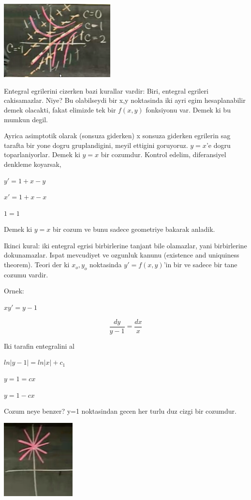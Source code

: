 \documentclass[12pt,fleqn]{article}
\begin{document}
\includegraphics[height=4cm]{./1_4.png}

Entegral egrilerini cizerken bazi kurallar vardir: Biri, entegral egrileri
cakisamazlar. Niye? Bu olabilseydi bir x,y noktasinda iki ayri egim
hesaplanabilir demek olacakti, fakat elimizde tek bir $f(x,y)$ fonksiyonu
var. Demek ki bu mumkun degil.

Ayrica asimptotik olarak (sonsuza giderken) x sonsuza giderken egrilerin sag
tarafta bir yone dogru gruplandigini, meyil ettigini goruyoruz. $y=x$'e dogru
toparlaniyorlar. Demek ki $y=x$ bir cozumdur. Kontrol edelim, diferansiyel
denkleme koyarsak,

$y' = 1+x-y$

$x' = 1+x-x$

$1 = 1$

Demek ki $y=x$ bir cozum ve bunu sadece geometriye bakarak anladik. 

Ikinci kural: iki entegral egrisi birbirlerine tanjant bile olamazlar, yani
birbirlerine dokunamazlar. Ispat mevcudiyet ve ozgunluk kanunu (existence and
uniquiness theorem). Teori der ki $x_o, y_o$ noktasinda $y'=f(x,y)$'in bir ve
sadece bir tane cozumu vardir. 

Ornek: 

$xy' = y - 1 $

\[ \frac{dy}{y-1} = \frac{dx}{x} \]

Iki tarafin entegralini al

$ln|y-1| = ln|x| + c_1$

$y=1 = cx$

$y = 1-cx$


Cozum neye benzer? y=1 noktasindan gecen her turlu duz cizgi bir cozumdur. 

\includegraphics[height=4cm]{1_5.png}
\end{document}

